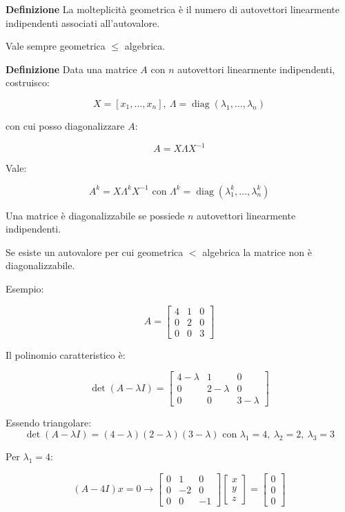 \documentclass{article}
\newcommand{\df}{\noindent\textbf{Definizione} }
\begin{document}
\df La molteplicità geometrica è il numero di autovettori linearmente indipendenti associati all'autovalore.\newline

Vale sempre geometrica $\leq$ algebrica.\newline

\df Data una matrice $A$ con $n$ autovettori linearmente indipendenti, costruisco:

\[
X=
[x_1,\ldots,x_n],\
\Lambda=
\operatorname{diag}(\lambda_1,\ldots,\lambda_n)
\]

\vspace{5pt}

con cui posso diagonalizzare $A$:

\[
A=X\Lambda X^{-1}
\]\newline

Vale:

\[
A^k
=
X\Lambda^kX^{-1}\text{ con }
\Lambda^k
=
\operatorname{diag}
(\lambda_1^k,\ldots,\lambda_n^k)
\]\newline

Una matrice è diagonalizzabile se possiede $n$ autovettori linearmente indipendenti.\newline

Se esiste un autovalore per cui geometrica $<$ algebrica la matrice non è diagonalizzabile.\newpage

Esempio:

\[
A=
\begin{bmatrix}
4 & 1 & 0\\
0 & 2 & 0\\
0 & 0 & 3
\end{bmatrix}
\]

\vspace{5pt}

Il polinomio caratteristico è:

\[
\det(A-\lambda I)=
\begin{bmatrix}
4-\lambda & 1 & 0\\
0 & 2-\lambda & 0\\
0 & 0 & 3-\lambda
\end{bmatrix}
\]

\vspace{5pt}

Essendo triangolare:
$$\det(A-\lambda I)
=(4-\lambda)(2-\lambda)(3-\lambda)\text{ con }\lambda_1=4,\
\lambda_2=2,\
\lambda_3=3$$

Per $\lambda_1=4$:

\[
(A-4I)x=0\rightarrow
\begin{bmatrix}
0 & 1 & 0\\
0 & -2 & 0\\
0 & 0 & -1
\end{bmatrix}
\begin{bmatrix}
x\\y\\z
\end{bmatrix}
=
\begin{bmatrix}
0\\0\\0
\end{bmatrix}
\]
\end{document}
